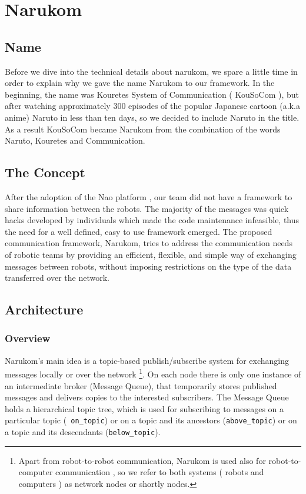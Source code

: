 \chapter{Narukom}
\label{Narukom}

\section{Name}
Before we dive into the technical details about narukom,  we spare a little time in order to explain why we gave the name Narukom to our framework. In the beginning, the name was Kouretes System of Communication ( KouSoCom ), but after watching approximately 300 episodes of the popular Japanese cartoon (a.k.a anime) Naruto in less than ten days, so we decided to include Naruto in the title. As a result KouSoCom became Narukom from the combination of the words Naruto, Kouretes and Communication.

\section{The Concept}
After the adoption of the Nao platform , our team did not have a framework to share information between the robots. The majority of the messages was quick hacks developed by individuals which made the code maintenance infeasible, thus  the need for a well defined, easy to use framework emerged. The proposed communication framework, Narukom, tries to address the communication needs of robotic teams by providing an efficient, flexible, and simple way of exchanging messages between robots, without imposing restrictions on the type of the data transferred over the network.

\section{Architecture}

\subsection{Overview}

Narukom's main idea is a topic-based publish/subscribe system for exchanging messages locally  or over the network \footnote[1]{ Apart from  robot-to-robot communication, Narukom is used also for robot-to-computer communication , so we refer to both systems ( robots and computers ) as network nodes or shortly nodes.}. On each node there is only one instance of  an intermediate broker (Message Queue), that temporarily stores published messages and delivers copies 
to the interested subscribers. The Message Queue holds a hierarchical topic tree, which is used for subscribing to messages on a particular topic ({\tt
on\_topic}) or on a topic and its ancestors ({\tt above\_topic}) or on a topic and its descendants ({\tt below\_topic}).

